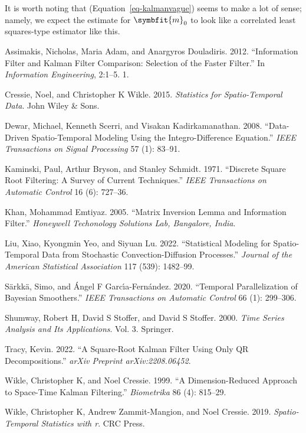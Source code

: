 \documentclass[
]{report}
\newlength{\cslhangindent}
\newenvironment{CSLReferences}[2] %
 {\begin{list}{}{%
  \setlength{\itemindent}{0pt}
  \setlength{\leftmargin}{0pt}
  \setlength{\parsep}{0pt}
  \ifodd #1
   \setlength{\leftmargin}{\cslhangindent}
   \setlength{\itemindent}{-1\cslhangindent}
  \fi
  \setlength{\itemsep}{#2\baselineskip}}}
 {\end{list}}
\newcommand{\bv}[1]{\symbfit{#1}}
\theoremstyle{plain}
\theoremstyle{plain}
\theoremstyle{plain}
\theoremstyle{remark}
\begin{document}
It is worth noting that (Equation~\ref{eq-kalmanvague}) seems to make a
lot of sense; namely, we expect the estimate for \(\bv m_0\) to look
like a correlated least squares-type estimator like this.

\label{refs}
\begin{CSLReferences}{1}{0}
Assimakis, Nicholas, Maria Adam, and Anargyros Douladiris. 2012.
{``Information Filter and Kalman Filter Comparison: Selection of the
Faster Filter.''} In \emph{Information Engineering}, 2:1--5. 1.

Cressie, Noel, and Christopher K Wikle. 2015. \emph{Statistics for
Spatio-Temporal Data}. John Wiley \& Sons.

Dewar, Michael, Kenneth Scerri, and Visakan Kadirkamanathan. 2008.
{``Data-Driven Spatio-Temporal Modeling Using the Integro-Difference
Equation.''} \emph{IEEE Transactions on Signal Processing} 57 (1):
83--91.

Kaminski, Paul, Arthur Bryson, and Stanley Schmidt. 1971. {``Discrete
Square Root Filtering: A Survey of Current Techniques.''} \emph{IEEE
Transactions on Automatic Control} 16 (6): 727--36.

Khan, Mohammad Emtiyaz. 2005. {``Matrix Inversion Lemma and Information
Filter.''} \emph{Honeywell Techonology Solutions Lab, Bangalore, India}.

Liu, Xiao, Kyongmin Yeo, and Siyuan Lu. 2022. {``Statistical Modeling
for Spatio-Temporal Data from Stochastic Convection-Diffusion
Processes.''} \emph{Journal of the American Statistical Association} 117
(539): 1482--99.

Särkkä, Simo, and Ángel F Garcı́a-Fernández. 2020. {``Temporal
Parallelization of Bayesian Smoothers.''} \emph{IEEE Transactions on
Automatic Control} 66 (1): 299--306.

Shumway, Robert H, David S Stoffer, and David S Stoffer. 2000.
\emph{Time Series Analysis and Its Applications}. Vol. 3. Springer.

Tracy, Kevin. 2022. {``A Square-Root Kalman Filter Using Only QR
Decompositions.''} \emph{arXiv Preprint arXiv:2208.06452}.

Wikle, Christopher K, and Noel Cressie. 1999. {``A Dimension-Reduced
Approach to Space-Time Kalman Filtering.''} \emph{Biometrika} 86 (4):
815--29.

Wikle, Christopher K, Andrew Zammit-Mangion, and Noel Cressie. 2019.
\emph{Spatio-Temporal Statistics with r}. CRC Press.

\end{CSLReferences}
\end{document}
